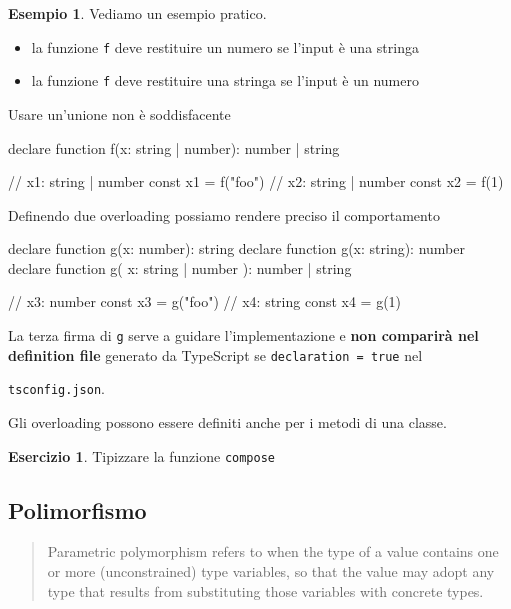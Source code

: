 \documentclass[12pt]{article}
\theoremstyle{definition}
\newtheorem{example}{Esempio}[subsection]
\newtheorem{exercise}{Esercizio}[subsection]
\newenvironment{code}
  {\vspace{0.5cm} \VerbatimEnvironment\begin{typescriptcode}}
  {\end{typescriptcode} \vspace{0.2cm}}
\begin{document}
\begin{example}
Vediamo un esempio pratico.

\begin{itemize}
  \item la funzione \texttt{f} deve restituire un numero se l'input è una stringa
  \item la funzione \texttt{f} deve restituire una stringa se l'input è un numero
\end{itemize}

Usare un'unione non è soddisfacente

\begin{code}
declare function f(x: string | number): number | string

// x1: string | number
const x1 = f("foo")
// x2: string | number
const x2 = f(1)
\end{code}

Definendo due overloading possiamo rendere preciso il comportamento

\begin{code}
declare function g(x: number): string
declare function g(x: string): number
declare function g(
  x: string | number
): number | string

// x3: number
const x3 = g("foo")
// x4: string
const x4 = g(1)
\end{code}

La terza firma di \texttt{g} serve a guidare l'implementazione e \textbf{non comparirà nel definition file}
generato da TypeScript se \texttt{declaration = true} nel

\texttt{tsconfig.json}.

Gli overloading possono essere definiti anche per i metodi di una classe.

\begin{exercise}
Tipizzare la funzione \texttt{compose}
\end{exercise}

\end{example}

\subsection{Polimorfismo}

\begin{quote}
Parametric polymorphism refers to when the type of a value contains one or more (unconstrained) type variables,
so that the value may adopt any type that results from substituting those variables with concrete types.
\end{quote}
\end{document}
